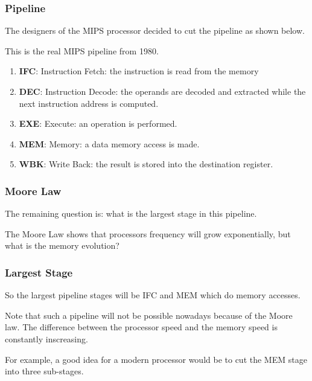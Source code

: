 \begin{frame}
  \frametitle{Pipeline}

  The designers of the MIPS processor decided to cut the pipeline as
  shown below.

  \nl

  This is the real MIPS pipeline from 1980.

  \begin{enumerate}
    \item
      \textbf{IFC}: Instruction Fetch: the instruction is read from the
      memory
    \item
      \textbf{DEC}: Instruction Decode: the operands are decoded and
      extracted while the next instruction address is computed.
    \item
      \textbf{EXE}: Execute: an operation is performed.
    \item
      \textbf{MEM}: Memory: a data memory access is made.
    \item
      \textbf{WBK}: Write Back: the result is stored into the destination
      register.
  \end{enumerate}
\end{frame}


\begin{frame}
  \frametitle{Moore Law}

  The remaining question is: what is the largest stage in this pipeline.

  \nl

  The Moore Law shows that processors frequency will grow exponentially,
  but what is the memory evolution?

  \begin{center}
  \end{center}
\end{frame}


\begin{frame}
  \frametitle{Largest Stage}

  So the largest pipeline stages will be IFC and MEM which do memory
  accesses.

  \nl

  Note that such a pipeline will not be possible nowadays because of the
  Moore law. The difference between the processor speed and the memory speed
  is constantly inscreasing.

  \nl

  For example, a good idea for a modern processor would be to cut the
  MEM stage into three sub-stages.
\end{frame}

